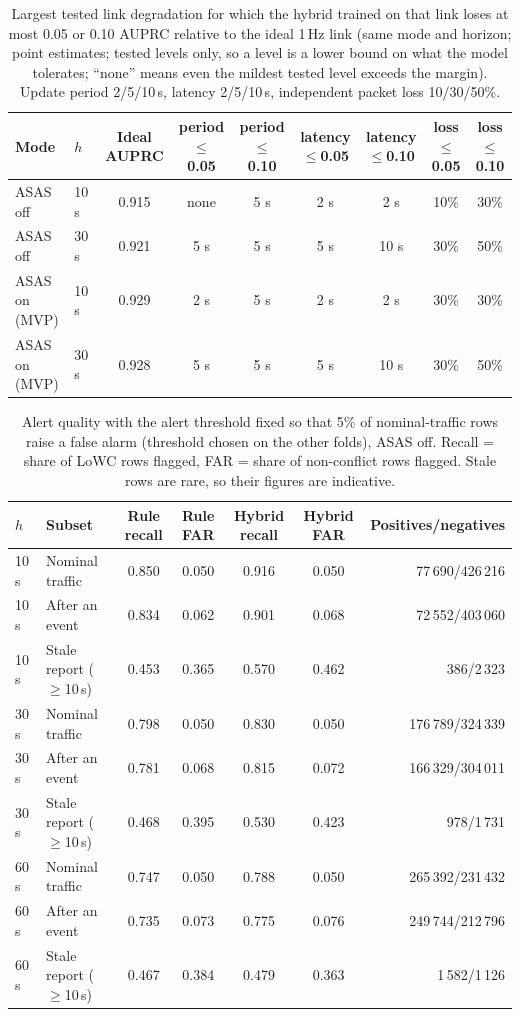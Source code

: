 \begin{table}[t]
\centering\small
\caption{Largest tested link degradation for which the hybrid trained on that link loses at most 0.05 or 0.10 AUPRC relative to the ideal 1\,Hz link (same mode and horizon; point estimates; tested levels only, so a level is a lower bound on what the model tolerates; ``none'' means even the mildest tested level exceeds the margin). Update period 2/5/10\,s, latency 2/5/10\,s, independent packet loss 10/30/50\%.}\label{tab:link_req}
\begin{tabular}{llccccccc}
\toprule
Mode & $h$ & Ideal AUPRC & period $\leq$0.05 & period $\leq$0.10 & latency $\leq$0.05 & latency $\leq$0.10 & loss $\leq$0.05 & loss $\leq$0.10 \\
\midrule
ASAS off & 10\,s & 0.915 & none & 5 s & 2 s & 2 s & 10\% & 30\% \\
ASAS off & 30\,s & 0.921 & 5 s & 5 s & 5 s & 10 s & 30\% & 50\% \\
ASAS on (MVP) & 10\,s & 0.929 & 2 s & 5 s & 2 s & 2 s & 30\% & 30\% \\
ASAS on (MVP) & 30\,s & 0.928 & 5 s & 5 s & 5 s & 10 s & 30\% & 50\% \\
\bottomrule
\end{tabular}
\end{table}

\begin{table}[t]
\centering\small
\caption{Alert quality with the alert threshold fixed so that 5\% of nominal-traffic rows raise a false alarm (threshold chosen on the other folds), ASAS off. Recall = share of LoWC rows flagged, FAR = share of non-conflict rows flagged. Stale rows are rare, so their figures are indicative.}\label{tab:ops}
\begin{tabular}{llccccr}
\toprule
$h$ & Subset & Rule recall & Rule FAR & Hybrid recall & Hybrid FAR & Positives/negatives \\
\midrule
10\,s & Nominal traffic & 0.850 & 0.050 & 0.916 & 0.050 & 77\,690/426\,216 \\
10\,s & After an event & 0.834 & 0.062 & 0.901 & 0.068 & 72\,552/403\,060 \\
10\,s & Stale report ($\geq$10\,s) & 0.453 & 0.365 & 0.570 & 0.462 & 386/2\,323 \\
30\,s & Nominal traffic & 0.798 & 0.050 & 0.830 & 0.050 & 176\,789/324\,339 \\
30\,s & After an event & 0.781 & 0.068 & 0.815 & 0.072 & 166\,329/304\,011 \\
30\,s & Stale report ($\geq$10\,s) & 0.468 & 0.395 & 0.530 & 0.423 & 978/1\,731 \\
60\,s & Nominal traffic & 0.747 & 0.050 & 0.788 & 0.050 & 265\,392/231\,432 \\
60\,s & After an event & 0.735 & 0.073 & 0.775 & 0.076 & 249\,744/212\,796 \\
60\,s & Stale report ($\geq$10\,s) & 0.467 & 0.384 & 0.479 & 0.363 & 1\,582/1\,126 \\
\bottomrule
\end{tabular}
\end{table}

